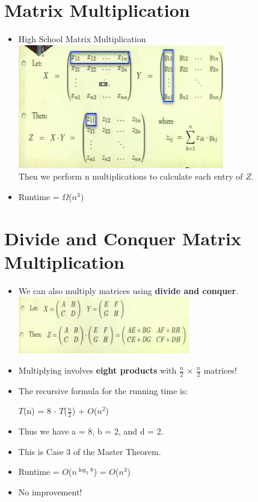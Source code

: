 \documentclass[12pt]{article}
\begin{document}
\section{Matrix Multiplication}
\renewcommand{\labelitemii}{$\circ$}
\renewcommand{\labelitemiii}{$\cdot$}
\renewcommand{\labelitemiii}{$\rightarrow$}
\begin{itemize}
\item High School Matrix Multiplication\\
\includegraphics{lecture45}\\
Then we perform n multiplications to calculate each entry of $Z$.
\item Runtime = $\Omega$($n^3$)
\end{itemize}

\section{Divide and Conquer Matrix Multiplication}
\renewcommand{\labelitemii}{$\circ$}
\renewcommand{\labelitemiii}{$\cdot$}
\renewcommand{\labelitemiii}{$\rightarrow$}
\begin{itemize}
\item We can also multiply matrices using \textbf{divide and conquer}.\\
\includegraphics{lecture46}
\item Multiplying involves \textbf{eight products} with $\frac{n}{2}$ $\times$ $\frac{n}{2}$ matrices!
\item The recursive formula for the running time is:
	
	\hspace*{\fill} {\large $T$(n) = 8 $\cdot$ $T$($\frac{n}{2}$) + $O$($n^2$) } \hspace*{\fill} 
	
	\item Thus we have a = 8, b = 2, and d = 2.
	\item This is Case 3 of the Master Theorem.
	\item Runtime = $O$($n^{\log_2 8}$) = $O$($n^3$)
	\item No improvement!
\end{itemize}
\end{document}
